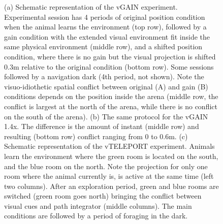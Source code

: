 \begin{figure}
\captionsetup{format=plain}
\caption[vGAIN]{
(a) Schematic representation of the vGAIN experiment. Experimental session has 4 periods of original position condition when the animal learns the environment (top row), followed by a gain condition with the extended visual environment fit inside the same physical environment (middle row), and a shifted position condition, where there is no gain but the visual projection is shifted 0.3m relative to the original condition (bottom row). Some sessions followed by a navigation dark (4th period, not shown). Note the visuo-idiothetic spatial conflict between original (A) and gain (B) conditions depends on the position inside the arena (middle row, the conflict is largest at the north of the arena, while there is no conflict on the south of the arena). (b) The same protocol for the vGAIN 1.4x. The difference is the amount of instant (middle row) and resulting (bottom row) conflict ranging from 0 to 0.6m. (c) Schematic representation of the vTELEPORT experiment. Animals learn the environment where the green room is located on the south, and the blue room on the north. Note the projection for only one room where the animal currently is, is active at the same time (left two columns). After an exploration period, green and blue rooms are switched (green room goes north) bringing the conflict between visual cues and path integrator (middle columns). The main conditions are followed by a period of foraging in the dark.
}
\label{fig:F8_vGAIN}
\end{figure}


